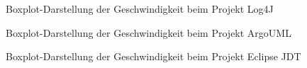  
 \begin{figure}
    \centering

    \caption{Boxplot-Darstellung der Geschwindigkeit beim Projekt Log4J}
    \label{fig:log4j_box}
\end{figure}

 \begin{figure}
    \centering

    \caption{Boxplot-Darstellung der Geschwindigkeit beim Projekt ArgoUML}
    \label{fig:argo_box}
\end{figure}

 \begin{figure}
    \centering

    \caption{Boxplot-Darstellung der Geschwindigkeit beim Projekt Eclipse JDT}
    \label{fig:eclipse_box}
\end{figure}